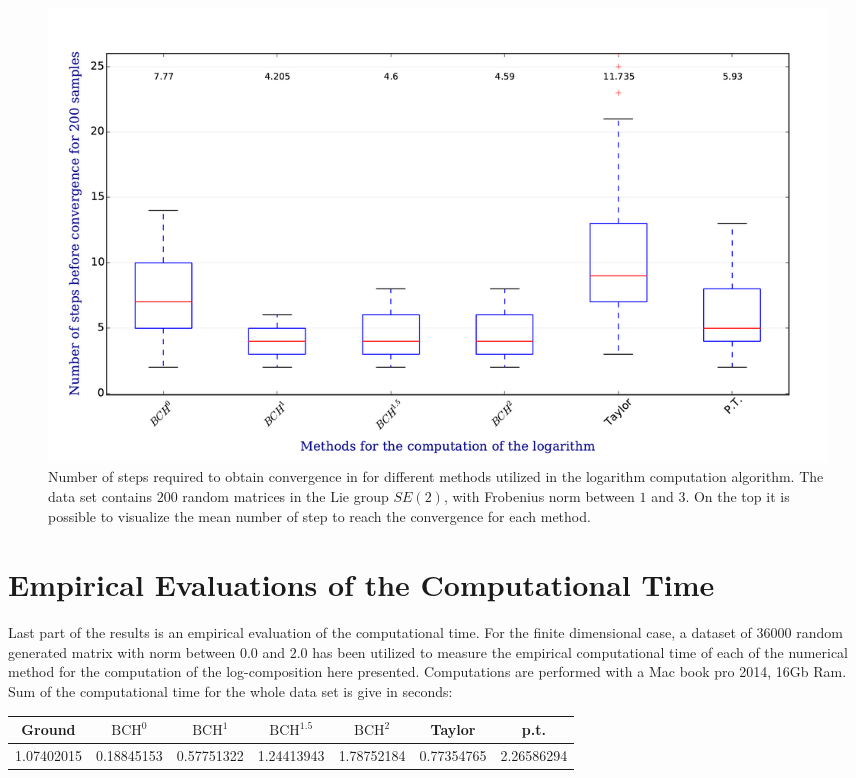 \begin{figure}[!ht]
	\hspace{-0.5cm}
	\includegraphics[scale=0.5]{figures/log_computation_boxplot.pdf}
	\caption{Number of steps required to obtain convergence in for different methods utilized in the logarithm computation algorithm. The data set contains $200$ random matrices in the Lie group $SE(2)$, with Frobenius norm between $1$ and $3$. On the top it is possible to visualize the mean number of step to reach the convergence for each method.}
	\label{fig:log_computation_boxplot}
\end{figure}


\section{Empirical Evaluations of the Computational Time}

Last part of the results is an empirical evaluation of the computational time. 
For the finite dimensional case, a dataset of $36000$ random generated matrix with norm between $0.0$ and $2.0$ has been utilized to measure the empirical computational time of each of the numerical method for the computation of the log-composition here presented. Computations are performed with a Mac book pro 2014, 16Gb Ram. Sum of the computational time for the whole data set is give in seconds:\\

\hspace{-1cm}
\begin{tabular}{ c | c | c | c | c | c | c }
Ground & $\text{BCH}^0$ & $\text{BCH}^1$ & $\text{BCH}^{1.5}$ & $\text{BCH}^2$ & Taylor & p.t. \\
\hline
1.07402015 & 0.18845153 & 0.57751322 & 1.24413943 & 1.78752184 & 0.77354765 &
2.26586294 
\end{tabular}
\vspace{0.5cm}


